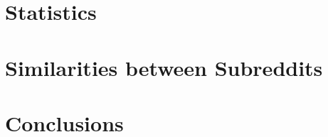 \documentclass{article}
\begin{document}
\section{Statistics}
\section{Similarities between Subreddits}
\section{Conclusions}
\end{document}
